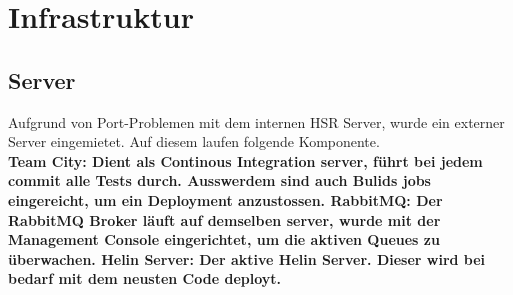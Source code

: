 \newpage

\chapter{Infrastruktur}

\section{Server}
Aufgrund von Port-Problemen mit dem internen HSR Server, wurde ein externer Server eingemietet. Auf diesem laufen folgende Komponente. \\
\bf{Team City: } Dient als Continous Integration server, führt bei jedem commit alle Tests durch. Ausswerdem sind auch Bulids jobs eingereicht, um ein Deployment anzustossen.
\bf{RabbitMQ: } Der RabbitMQ Broker läuft auf demselben server, wurde mit der Management Console eingerichtet, um die aktiven Queues zu überwachen.
\bf{Helin Server: } Der aktive Helin Server. Dieser wird bei bedarf mit dem neusten Code deployt.


